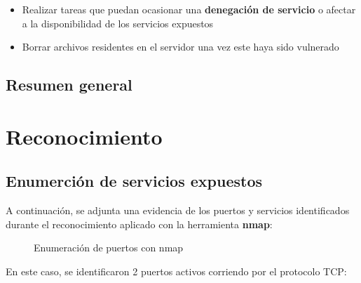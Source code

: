 \documentclass[a4paper]{article} %
\begin{document}
      \begin{itemize}
        \item Realizar tareas que puedan ocasionar una \textbf{denegación de servicio} o afectar a la disponibilidad
          de los servicios expuestos
        \item Borrar archivos residentes en el servidor una vez este haya sido vulnerado 
      \end{itemize}

  \subsection{Resumen general}

  \clearpage

  \section{Reconocimiento}
  \subsection{Enumerción de servicios expuestos}
  
  A continuación, se adjunta una evidencia de los puertos y servicios identificados durante el reconocimiento 
  aplicado con la herramienta \textbf{nmap}:

  \begin{figure}[h]
    \centering
    \setlength{\fboxrule}{0.8pt}
    \caption{Enumeración de puertos con nmap}
  \end{figure}
  
  \vspace{0.3cm}

  En este caso, se identificaron 2 puertos activos corriendo por el protocolo TCP:
  
  \vspace{0.5cm}

  \centering

  \vspace{0.5cm}
  
\end{document}
